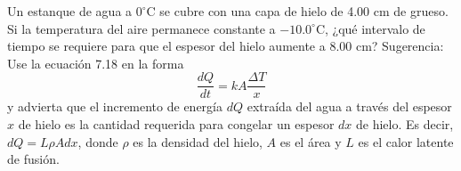 \item Un estanque de agua a $0^\circ\text{C}$ se cubre con una capa de hielo de 4.00 cm de grueso. Si la temperatura del aire permanece constante a $-10.0^\circ\text{C}$, ¿qué intervalo de tiempo se requiere para que el espesor del hielo aumente a 8.00 cm? 
Sugerencia: Use la ecuación 7.18 en la forma
$$ \frac{dQ}{dt} = kA \frac{\Delta T}{x} $$
y advierta que el incremento de energía $dQ$ extraída del agua a través del espesor $x$ de hielo es la cantidad requerida para congelar un espesor $dx$ de hielo. Es decir, $dQ = L \rho A dx$, donde $\rho$ es la densidad del hielo, $A$ es el área y $L$ es el calor latente de fusión.
